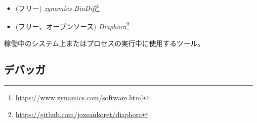 \begin{itemize}
\item (フリー) \emph{zynamics BinDiff}\footnote{\url{https://www.zynamics.com/software.html}}

\item (フリー、オープンソース) \emph{Diaphora}\footnote{\url{https://github.com/joxeankoret/diaphora}}
\end{itemize}


稼働中のシステム上またはプロセスの実行中に使用するツール。

\subsection{デバッガ}

\myindex{\olly}

